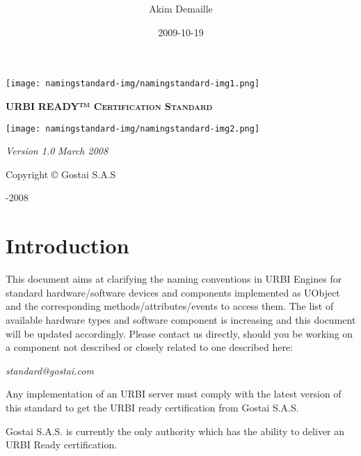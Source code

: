 \documentclass[a4paper]{article}
\title{ }
\author{Akim Demaille}
\date{2009-10-19}
\begin{document}
{\centering 
\texttt{[image: namingstandard-img/namingstandard-img1.png]}
\par}

{\centering{}
\textsf{\textbf{\textsc{URBI }}}\textsf{\textbf{\textsc{READY™
Certification Standard}}}
\par}

{\centering 
\texttt{[image: namingstandard-img/namingstandard-img2.png]}
\par}

{\centering{}
\textsf{\textit{Version 1.0}}  \textsf{\textit{March 2008}}
\par}

{\centering{}\sffamily
Copyright © Gostai S.A.S
\par}

{\centering{}-2008
\par}

\setcounter{tocdepth}{3}
\renewcommand\contentsname{}
\tableofcontents
\section[]{ }
\section[Introduction]{ Introduction}
{
\textsf{This document aims at clarifying the naming convention}\textsf{s
in URBI Engines for standard hardware/software devices and components
implemented as }UObject\textsf{ and the corresponding
methods/attributes/events to access them. The list of available
hardware types and software component is increasing and this document
will be updated accordingly. Please contact us directly, should you be
working on a component not described or closely related to one
described here:}}

{\centering{}\sffamily\itshape
standard@gostai.com
\par}

{\sffamily
Any implementation of an URBI server must comply with the latest version
of this standard to get the {\textquotedbl}URBI ready{\textquotedbl}
certification from Gostai S.A.S.}

{\sffamily
Gostai S.A.S. is currently the only authority which has the ability to
deliver an {\textquotedbl}URBI Ready{\textquotedbl} certification.}
\end{document}
